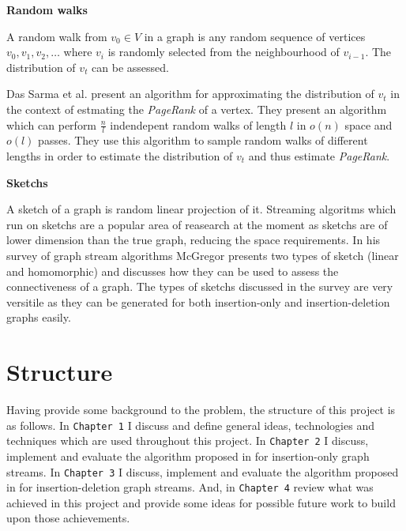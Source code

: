 \documentclass[11pt,twoside,a4paper]{report}
\begin{document}
\par\noindent\textbf{Random walks}
\par A random walk from $v_0\in V$ in a graph is any random sequence of vertices $v_0,v_1,v_2,\dots$ where $v_i$ is randomly selected from the neighbourhood of $v_{i-1}$. The distribution of $v_t$ can be assessed.
\par Das Sarma et al. \cite{RandomWalks} present an algorithm for approximating the distribution of $v_t$ in the context of estmating the \textit{PageRank} of a vertex. They present an algorithm which can perform $\frac{n}{l}$ indendepent random walks of length $l$ in $o(n)$ space and $o(l)$ passes. They use this algorithm to sample random walks of different lengths in order to estimate the distribution of $v_t$ and thus estimate \textit{PageRank}.\newline

\par\noindent\textbf{Sketchs}
\par A sketch of a graph is random linear projection of it. Streaming algoritms which run on sketchs are a popular area of reasearch at the moment as sketchs are of lower dimension than the true graph, reducing the space requirements. In his survey of graph stream algorithms \cite{GraphStreamSurvey} McGregor presents two types of sketch (linear and homomorphic) and discusses how they can be used to assess the connectiveness of a graph. The types of sketchs discussed in the survey are very versitile as they can be generated for both insertion-only and insertion-deletion graphs easily.

\section{Structure}
Having provide some background to the problem, the structure of this project is as follows. In \texttt{Chapter 1} I discuss and define general ideas, technologies and techniques which are used throughout this project. In \texttt{Chapter 2} I discuss, implement and evaluate the algorithm proposed in \cite{orig} for insertion-only graph streams. In \texttt{Chapter 3} I discuss, implement and evaluate the algorithm proposed in \cite{orig} for insertion-deletion graph streams. And, in \texttt{Chapter 4} review what was achieved in this project and provide some ideas for possible future work to build upon those achievements.


\renewcommand\thechapter{\arabic{chapter}}
\renewcommand\thesection{\thechapter.\arabic{section}}
\renewcommand\thesubsection{\thesection.\arabic{subsection}}
\setcounter{chapter}{0}
\end{document}
